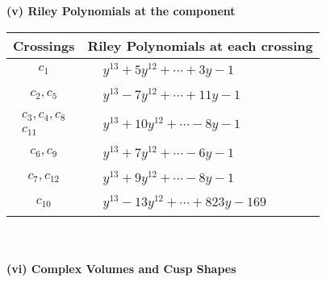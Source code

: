 \documentclass[1p]{elsarticle_modified}
\theoremstyle{definition}
\begin{document}
\newpage\renewcommand{\arraystretch}{1}
\flushleft \textbf{(v) Riley Polynomials at the component}\newline \\
\begin{tabular}{m{50pt}|m{274pt}}
Crossings & \hspace{64pt}Riley Polynomials at each crossing \\
\hline $$\begin{aligned}c_{1}\end{aligned}$$&$\begin{aligned}
&y^{13}+5 y^{12}+\cdots+3 y-1
\end{aligned}$\\
\hline $$\begin{aligned}c_{2},c_{5}\end{aligned}$$&$\begin{aligned}
&y^{13}-7 y^{12}+\cdots+11 y-1
\end{aligned}$\\
\hline $$\begin{aligned}c_{3},c_{4},c_{8}\\c_{11}\end{aligned}$$&$\begin{aligned}
&y^{13}+10 y^{12}+\cdots-8 y-1
\end{aligned}$\\
\hline $$\begin{aligned}c_{6},c_{9}\end{aligned}$$&$\begin{aligned}
&y^{13}+7 y^{12}+\cdots-6 y-1
\end{aligned}$\\
\hline $$\begin{aligned}c_{7},c_{12}\end{aligned}$$&$\begin{aligned}
&y^{13}+9 y^{12}+\cdots-8 y-1
\end{aligned}$\\
\hline $$\begin{aligned}c_{10}\end{aligned}$$&$\begin{aligned}
&y^{13}-13 y^{12}+\cdots+823 y-169
\end{aligned}$\\
\hline
\end{tabular}\\~\\
\newpage\flushleft \textbf{(vi) Complex Volumes and Cusp Shapes}
\end{document}
